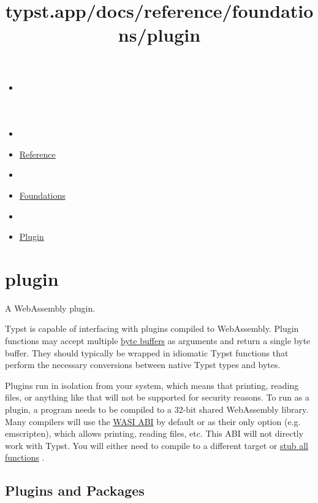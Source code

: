 \title{typst.app/docs/reference/foundations/plugin}

\begin{itemize}
\tightlist
\item
  \href{/docs}{}
\item
  
\item
  \href{/docs/reference/}{Reference}
\item
  
\item
  \href{/docs/reference/foundations/}{Foundations}
\item
  
\item
  \href{/docs/reference/foundations/plugin/}{Plugin}
\end{itemize}

\section{\texorpdfstring{{ plugin }}{ plugin }}\label{summary}

A WebAssembly plugin.

Typst is capable of interfacing with plugins compiled to WebAssembly.
Plugin functions may accept multiple
\href{/docs/reference/foundations/bytes/}{byte buffers} as arguments and
return a single byte buffer. They should typically be wrapped in
idiomatic Typst functions that perform the necessary conversions between
native Typst types and bytes.

Plugins run in isolation from your system, which means that printing,
reading files, or anything like that will not be supported for security
reasons. To run as a plugin, a program needs to be compiled to a 32-bit
shared WebAssembly library. Many compilers will use the
\href{https://wasi.dev/}{WASI ABI} by default or as their only option
(e.g. emscripten), which allows printing, reading files, etc. This ABI
will not directly work with Typst. You will either need to compile to a
different target or
\href{https://github.com/astrale-sharp/wasm-minimal-protocol/blob/master/wasi-stub}{stub
all functions} .

\subsection{Plugins and Packages}\label{plugins-and-packages}

